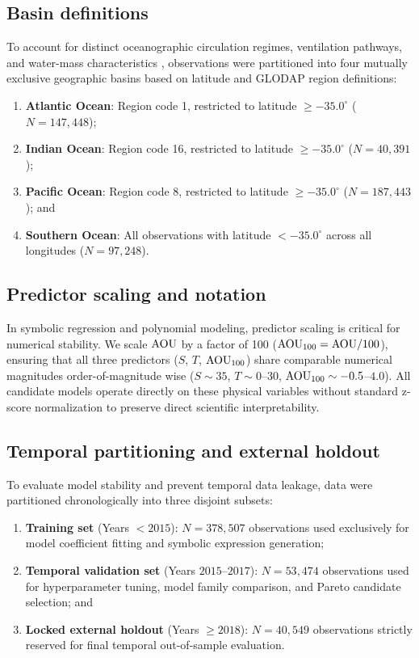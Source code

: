 \subsection{Basin definitions}
To account for distinct oceanographic circulation regimes, ventilation pathways, and water-mass characteristics \citep{Tomczak2002}, observations were partitioned into four mutually exclusive geographic basins based on latitude and GLODAP region definitions:
\begin{enumerate}[label=(\roman*)]
\item \textbf{Atlantic Ocean}: Region code 1, restricted to latitude $\ge -35.0^\circ$ ($N = 147{,}448$);
\item \textbf{Indian Ocean}: Region code 16, restricted to latitude $\ge -35.0^\circ$ ($N = 40{,}391$);
\item \textbf{Pacific Ocean}: Region code 8, restricted to latitude $\ge -35.0^\circ$ ($N = 187{,}443$); and
\item \textbf{Southern Ocean}: All observations with latitude $< -35.0^\circ$ across all longitudes ($N = 97{,}248$).
\end{enumerate}

\subsection{Predictor scaling and notation}
In symbolic regression and polynomial modeling, predictor scaling is critical for numerical stability. We scale $\mathrm{AOU}$ by a factor of 100 ($\mathrm{AOU}_{100} = \mathrm{AOU} / 100$), ensuring that all three predictors ($S$, $T$, $\mathrm{AOU}_{100}$) share comparable numerical magnitudes order-of-magnitude wise ($S \sim 35$, $T \sim 0$--$30$, $\mathrm{AOU}_{100} \sim -0.5$--$4.0$). All candidate models operate directly on these physical variables without standard z-score normalization to preserve direct scientific interpretability.

\subsection{Temporal partitioning and external holdout}
To evaluate model stability and prevent temporal data leakage, data were partitioned chronologically into three disjoint subsets:
\begin{enumerate}[label=(\roman*)]
\item \textbf{Training set} (Years $< 2015$): $N = 378{,}507$ observations used exclusively for model coefficient fitting and symbolic expression generation;
\item \textbf{Temporal validation set} (Years $2015$--$2017$): $N = 53{,}474$ observations used for hyperparameter tuning, model family comparison, and Pareto candidate selection; and
\item \textbf{Locked external holdout} (Years $\ge 2018$): $N = 40{,}549$ observations strictly reserved for final temporal out-of-sample evaluation.
\end{enumerate}

